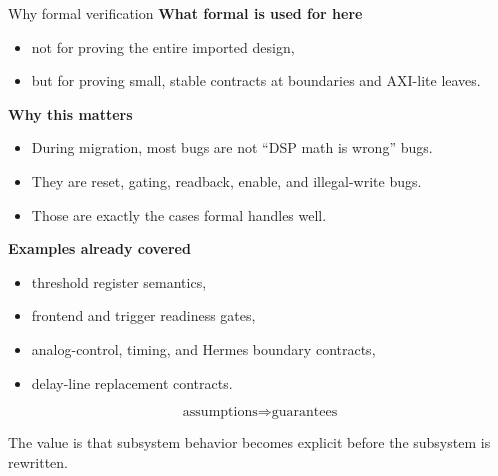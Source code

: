 \documentclass[aspectratio=169]{beamer}
\begin{document}
\begin{frame}{Why formal verification}
\small
\textbf{What formal is used for here}
\begin{itemize}
  \item not for proving the entire imported design,
  \item but for proving small, stable contracts at boundaries and AXI-lite leaves.
\end{itemize}

\vspace{1mm}
\textbf{Why this matters}
\begin{itemize}
  \item During migration, most bugs are not ``DSP math is wrong'' bugs.
  \item They are reset, gating, readback, enable, and illegal-write bugs.
  \item Those are exactly the cases formal handles well.
\end{itemize}

\vspace{1mm}
\textbf{Examples already covered}
\begin{itemize}
  \item threshold register semantics,
  \item frontend and trigger readiness gates,
  \item analog-control, timing, and Hermes boundary contracts,
  \item delay-line replacement contracts.
\end{itemize}

\vspace{1mm}
\[
\text{assumptions} \Rightarrow \text{guarantees}
\]

\vspace{1mm}
The value is that subsystem behavior becomes explicit before the subsystem is rewritten.
\end{frame}
\end{document}
